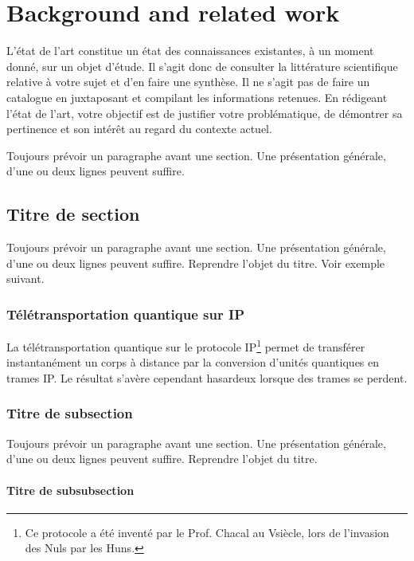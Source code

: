 \chapter{Background and related work}
\label{chap:background}

L'état de l'art constitue un état des connaissances existantes, à un moment donné, sur un objet d'étude. Il s'agit donc de consulter la littérature scientifique relative à votre sujet et d'en faire une synthèse. Il ne s'agit pas de faire un \og catalogue \fg{} en juxtaposant et compilant les informations retenues. En rédigeant l'état de l'art, votre objectif est de justifier votre problématique, de démontrer sa pertinence et son intérêt au regard du contexte actuel.

Toujours prévoir un paragraphe avant une section. Une présentation générale, d'une ou deux lignes peuvent suffire.

\section{Titre de section}

Toujours prévoir un paragraphe avant une section. Une présentation
générale, d'une ou deux lignes peuvent suffire. Reprendre l'objet du
titre. Voir exemple suivant.

\subsection{Télétransportation quantique sur IP}

La télétransportation quantique sur le protocole IP\footnote{Ce
  protocole a été inventé par le Prof. Chacal au V\ieme siècle, lors de
  l'invasion des Nuls par les Huns.} permet de transférer
instantanément un corps à distance par la conversion d'unités
quantiques en trames IP. Le résultat s'avère cependant hasardeux
lorsque des trames se perdent.

\subsection{Titre de subsection}

Toujours prévoir un paragraphe avant une section. Une présentation
générale, d'une ou deux lignes peuvent suffire. Reprendre l'objet du
titre.


\subsubsection{Titre de subsubsection}

